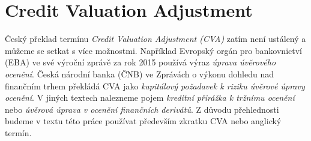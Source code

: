 \documentclass[a4paper,12pt]{report}
\theoremstyle{definition} \newtheorem{definice}[veta]{Definice}
\theoremstyle{remark}
\begin{document}
\section{Credit Valuation Adjustment}\label{CVA_kap}
Český překlad termínu \textit{Credit Valuation Adjustment (CVA)} zatím není ustálený a můžeme se setkat s více možnostmi.
Například Evropský orgán pro bankovnictví (EBA) ve své výroční zprávě za rok 2015 \cite{eba_2015} používá výraz \textit{úprava úvěrového ocenění}.
Česká národní banka (ČNB) ve Zprávách o výkonu dohledu nad finančním trhem \cite{cnb_2015} překládá CVA jako \textit{kapitálový požadavek k riziku úvěrové úpravy ocenění}.
V jiných textech nalezneme pojem  \textit{kreditní přirážka k tržnímu ocenění} nebo \textit{úvěrová úprava v ocenění finančních derivátů}.
Z důvodu přehlednosti budeme v textu této práce používat především zkratku CVA nebo anglický termín.



\end{document}
